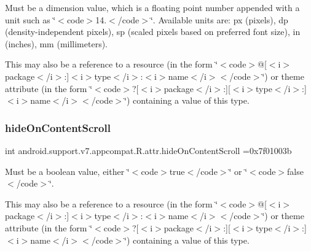 Must be a dimension value, which is a floating point number appended with a unit such as \char`\"{}$<$code$>$14.\+5sp$<$/code$>$\char`\"{}. Available units are\+: px (pixels), dp (density-\/independent pixels), sp (scaled pixels based on preferred font size), in (inches), mm (millimeters). 

This may also be a reference to a resource (in the form \char`\"{}$<$code$>$@\mbox{[}$<$i$>$package$<$/i$>$\+:\mbox{]}$<$i$>$type$<$/i$>$\+:$<$i$>$name$<$/i$>$$<$/code$>$\char`\"{}) or theme attribute (in the form \char`\"{}$<$code$>$?\mbox{[}$<$i$>$package$<$/i$>$\+:\mbox{]}\mbox{[}$<$i$>$type$<$/i$>$\+:\mbox{]}$<$i$>$name$<$/i$>$$<$/code$>$\char`\"{}) containing a value of this type. \mbox{\label{classandroid_1_1support_1_1v7_1_1appcompat_1_1R_1_1attr_acd8f7a0451e3e9f87d4b5637d3adcf2f}} 
\subsubsection{\texorpdfstring{hide\+On\+Content\+Scroll}{hideOnContentScroll}}
{\footnotesize\ttfamily int android.\+support.\+v7.\+appcompat.\+R.\+attr.\+hide\+On\+Content\+Scroll =0x7f01003b\hspace{0.3cm}{\ttfamily [static]}}

Must be a boolean value, either \char`\"{}$<$code$>$true$<$/code$>$\char`\"{} or \char`\"{}$<$code$>$false$<$/code$>$\char`\"{}. 

This may also be a reference to a resource (in the form \char`\"{}$<$code$>$@\mbox{[}$<$i$>$package$<$/i$>$\+:\mbox{]}$<$i$>$type$<$/i$>$\+:$<$i$>$name$<$/i$>$$<$/code$>$\char`\"{}) or theme attribute (in the form \char`\"{}$<$code$>$?\mbox{[}$<$i$>$package$<$/i$>$\+:\mbox{]}\mbox{[}$<$i$>$type$<$/i$>$\+:\mbox{]}$<$i$>$name$<$/i$>$$<$/code$>$\char`\"{}) containing a value of this type. \mbox{\label{classandroid_1_1support_1_1v7_1_1appcompat_1_1R_1_1attr_ae3ff8656ab6c146f92c9e92940809add}} 
